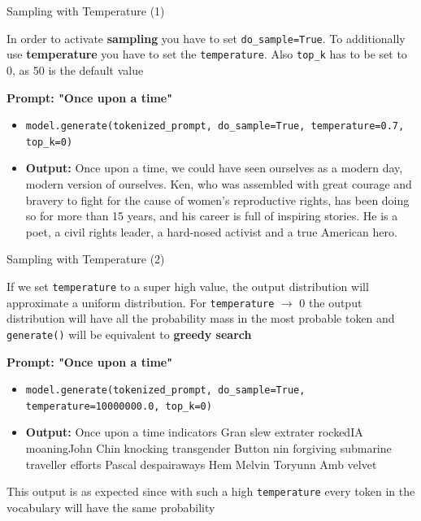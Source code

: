 \begin{vbframe}{Sampling with Temperature (1)}

\vfill

In order to activate \textbf{sampling} you have to set \texttt{do\_sample=True}. To additionally use \textbf{temperature} you have to set the \texttt{temperature}. Also \texttt{top\_k} has to be set to 0, as 50 is the default value

\textbf{Prompt: "Once upon a time"}

\begin{itemize}
    \item \texttt{model.generate(tokenized\_prompt, do\_sample=True, temperature=0.7, top\_k=0)}
    \item \textbf{Output:} Once upon a time, we could have seen ourselves as a modern day, modern version of ourselves. Ken, who was assembled with great courage and bravery to fight for the cause of women's reproductive rights, has been doing so for more than 15 years, and his career is full of inspiring stories. He is a poet, a civil rights leader, a hard-nosed activist and a true American hero.
\end{itemize}

\vfill

\end{vbframe}


\begin{vbframe}{Sampling with Temperature (2)}

\vfill

If we set \texttt{temperature} to a super high value, the output distribution will approximate a uniform distribution. For \texttt{temperature} $\rightarrow$ 0 the output distribution will have all the probability mass in the most probable token and \texttt{generate()} will be equivalent to \textbf{greedy search}

\textbf{Prompt: "Once upon a time"}

\begin{itemize}
    \item \texttt{model.generate(tokenized\_prompt, do\_sample=True, temperature=10000000.0, top\_k=0)}
    \item \textbf{Output:} Once upon a time indicators Gran slew extrater rockedIA moaningJohn Chin knocking transgender Button nin forgiving submarine traveller efforts Pascal despairaways Hem Melvin Toryunn Amb velvet
\end{itemize}

\vfill

This output is as expected since with such a high \texttt{temperature} every token in the vocabulary will have the same probability

\end{vbframe}

